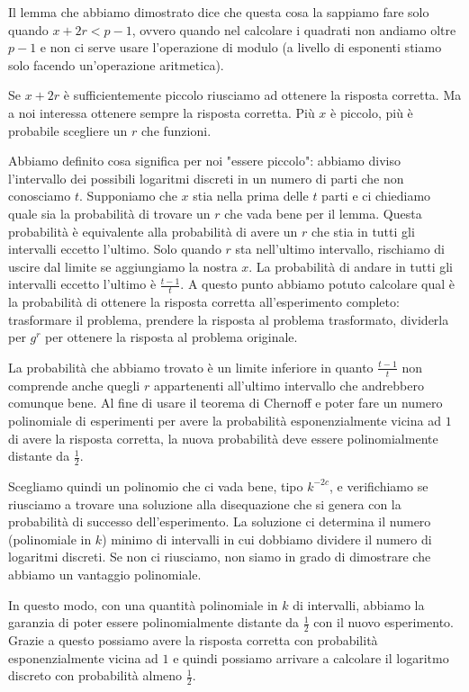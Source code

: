 \begin{itemize}
    Il lemma che abbiamo dimostrato dice che questa cosa la sappiamo fare solo quando $x+2r < p-1$, ovvero quando nel calcolare i quadrati non andiamo oltre $p-1$ e non ci serve usare l'operazione di modulo (a livello di esponenti stiamo solo facendo un'operazione aritmetica). 

    Se $x+2r$ è sufficientemente piccolo riusciamo ad ottenere la risposta corretta. Ma a noi interessa ottenere sempre la risposta corretta. Più $x$ è piccolo, più è probabile scegliere un $r$ che funzioni.

    Abbiamo definito cosa significa per noi "essere piccolo": abbiamo diviso l'intervallo dei possibili logaritmi discreti in un numero di parti che non conosciamo $t$. Supponiamo che 
    $x$ stia nella prima delle $t$ parti e ci chiediamo quale sia la probabilità di trovare un $r$ che vada bene per il lemma. Questa probabilità è equivalente alla probabilità di avere un $r$ che stia in tutti gli intervalli eccetto l'ultimo. Solo quando  $r$ sta nell'ultimo intervallo, rischiamo di uscire dal limite se aggiungiamo la nostra $x$.
    La probabilità di andare in tutti gli intervalli eccetto l'ultimo è $\frac{t-1}{t}$. A questo punto abbiamo potuto calcolare qual è la probabilità di ottenere la risposta corretta all'esperimento completo: trasformare il problema, prendere la risposta al problema trasformato, dividerla per $g^r$ per ottenere la risposta al problema originale.

    La probabilità che abbiamo trovato è un limite inferiore in quanto $\frac{t-1}{t}$ non comprende anche quegli $r$ appartenenti all'ultimo intervallo che andrebbero comunque bene. Al fine di usare il teorema di Chernoff e poter fare un numero polinomiale di esperimenti per avere la probabilità esponenzialmente vicina ad $1$ di avere la risposta corretta, la nuova probabilità deve essere polinomialmente distante da $\frac{1}{2}$. 

    Scegliamo quindi un polinomio che ci vada bene, tipo $k^{-2c}$, e verifichiamo se riusciamo a trovare una soluzione alla disequazione che si genera con la probabilità di successo dell'esperimento. La soluzione ci determina il numero (polinomiale in $k$) minimo di intervalli in cui dobbiamo dividere il numero di logaritmi discreti. Se non ci riusciamo, non siamo in grado di dimostrare che abbiamo un vantaggio polinomiale. 

    In questo modo, con una quantità polinomiale in $k$ di intervalli, abbiamo la garanzia di poter essere polinomialmente distante da $\frac{1}{2}$ con il nuovo esperimento. Grazie a questo possiamo avere la risposta corretta con probabilità esponenzialmente vicina ad $1$ e quindi possiamo arrivare a calcolare il logaritmo discreto con probabilità almeno $\frac{1}{2}$.


\end{itemize}

